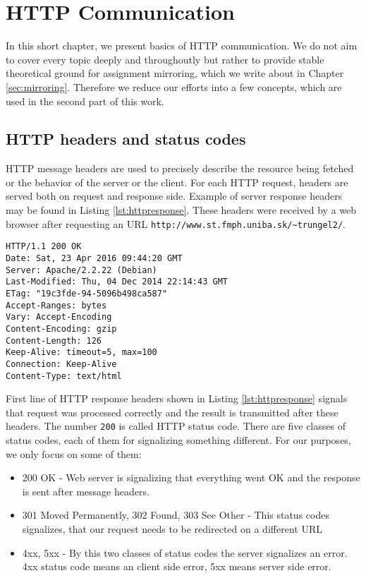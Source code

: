 \chapter{HTTP Communication}

In this short chapter, we present basics of HTTP communication. We do not aim to cover every topic deeply and throughoutly but rather to provide stable theoretical ground for assignment mirroring, which we write about in Chapter \ref{sec:mirroring}.
Therefore we reduce our efforts into a few  concepts, which are used in the second part of this work.

\section{HTTP headers and status codes}
HTTP message headers are used to precisely describe the resource being fetched or the behavior of the server or the client. \cite{mozzila} For each HTTP request, headers are served both on request and response side. Example of server response headers may be found in Listing \ref{lst:httpresponse}. These headers were received by a web browser after requesting an URL \texttt{http://www.st.fmph.uniba.sk/\textasciitilde trungel2/}.

\begin{lstlisting}[caption={Http response headers},label={lst:httpresponse}]
HTTP/1.1 200 OK
Date: Sat, 23 Apr 2016 09:44:20 GMT
Server: Apache/2.2.22 (Debian)
Last-Modified: Thu, 04 Dec 2014 22:14:43 GMT
ETag: "19c3fde-94-5096b498ca587"
Accept-Ranges: bytes
Vary: Accept-Encoding
Content-Encoding: gzip
Content-Length: 126
Keep-Alive: timeout=5, max=100
Connection: Keep-Alive
Content-Type: text/html
\end{lstlisting}

First line of HTTP response headers shown in Listing \ref{lst:httpresponse} signals that request was processed correctly and the result is transmitted after these headers. The number \texttt{200} is called HTTP status code. There are five classes of status codes, each of them for signalizing something different. For our purposes, we only focus on some of them:

\begin{itemize}
\item 200 OK - Web server is signalizing that everything went OK and the response is sent after message headers.
\item 301 Moved Permanently, 302 Found, 303 See Other - This status codes signalizes, that our request needs to be redirected on a different URL
\item 4xx, 5xx - By this two classes of status codes the server signalizes an error. 4xx status code means an client side error, 5xx means server side error.
\end{itemize} 

